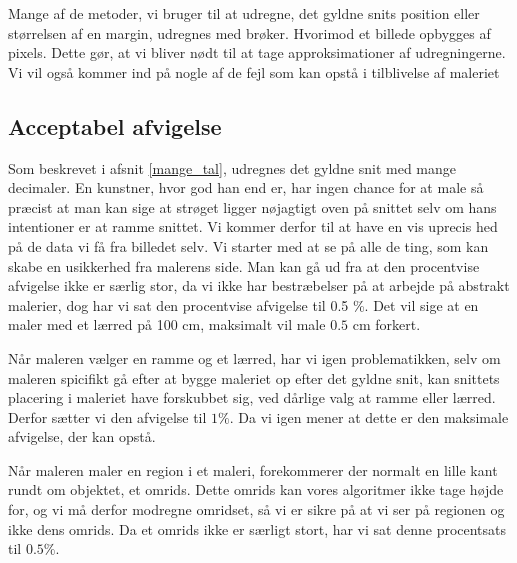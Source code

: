 \textsf{
Mange af de metoder, vi bruger til at udregne, det gyldne snits position
eller størrelsen af en margin, udregnes med brøker. Hvorimod et billede
opbygges af pixels. Dette gør, at vi bliver nødt til at tage
approksimationer af udregningerne. Vi vil også kommer ind på nogle af de
fejl som kan opstå i tilblivelse af maleriet}

\subsection{Acceptabel afvigelse}

Som beskrevet i afsnit \ref{mange_tal}, udregnes
det gyldne snit med mange decimaler. En kunstner, hvor god han end er,
har ingen chance for at male så præcist at man kan sige at strøget
ligger nøjagtigt oven på snittet selv om hans intentioner er at ramme
snittet. Vi kommer derfor til at have en vis uprecis hed på de data vi
få fra billedet selv. Vi starter med at se på alle de ting, som kan
skabe en usikkerhed fra malerens side. Man kan gå ud fra at den
procentvise afvigelse ikke er særlig stor, da vi ikke har bestræbelser
på at arbejde på abstrakt malerier, dog har vi sat den procentvise
afvigelse til 0.5 \%. Det vil sige at en maler med et lærred på 100
cm, maksimalt vil male $0.5$ cm forkert.

Når maleren vælger en ramme og et lærred, har vi igen problematikken,
selv om maleren spicifikt gå efter at bygge maleriet op efter det gyldne
snit, kan snittets placering i maleriet have forskubbet sig, ved dårlige
valg at ramme eller lærred. Derfor sætter vi den afvigelse til $1\%$. Da
vi igen mener at dette er den maksimale afvigelse, der kan opstå.

Når maleren maler en region i et maleri, forekommerer der normalt en
lille kant rundt om objektet, et omrids. Dette omrids kan vores
algoritmer ikke tage højde for, og vi må derfor modregne omridset, så vi
er sikre på at vi ser på regionen og ikke dens omrids. Da et omrids ikke
er særligt stort, har vi sat denne procentsats til $0.5\%$. 

